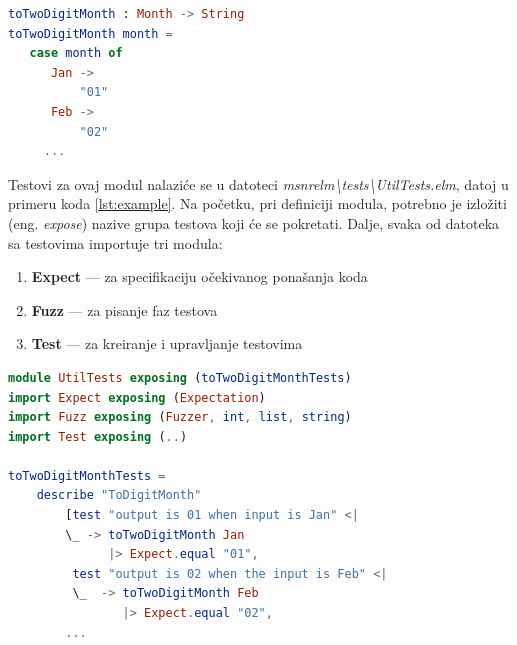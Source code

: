 \documentclass[12pt,oneside]{memoir}
\begin{document}
\begin{minipage}{\linewidth}
\begin{lstlisting}[language=elm, basicstyle=\small, caption={Funkcija \emph{toTwoDigitMonth}},captionpos=b, label={lst:utilprimer}]
toTwoDigitMonth : Month -> String
toTwoDigitMonth month =
   case month of
      Jan ->
          "01"
      Feb ->
          "02"
     ...
\end{lstlisting}
\end{minipage}

\vspace*{1\baselineskip}
\par Testovi za ovaj modul nalaziće se u datoteci \emph{msnr{\textunderscore}elm{\textbackslash}tests{\textbackslash}UtilTests.elm}, datoj u primeru koda \ref{lst:example}. Na početku, pri definiciji modula, potrebno je izložiti (eng. \emph{expose}) nazive grupa testova koji će se pokretati. Dalje, svaka od datoteka sa testovima importuje tri modula: 

\begin{enumerate}
\item \textbf{Expect} --- za specifikaciju očekivanog ponašanja koda
\item \textbf{Fuzz} --- za pisanje faz testova 
\item \textbf{Test} --- za kreiranje i upravljanje testovima
\end{enumerate}

\begin{minipage}{\linewidth}
\begin{lstlisting}[language=elm, basicstyle=\small, caption={Implementacija testova za funkciju \emph{toTwoDigitMonth}},captionpos=b, label={lst:example}]
module UtilTests exposing (toTwoDigitMonthTests)
import Expect exposing (Expectation)
import Fuzz exposing (Fuzzer, int, list, string)
import Test exposing (..)

toTwoDigitMonthTests = 
    describe "ToDigitMonth" 
        [test "output is 01 when input is Jan" <|
        \_ -> toTwoDigitMonth Jan
              |> Expect.equal "01", 
         test "output is 02 when the input is Feb" <|
         \_  -> toTwoDigitMonth Feb
                |> Expect.equal "02",
        ... 
\end{lstlisting}
\end{minipage}
\end{document}
